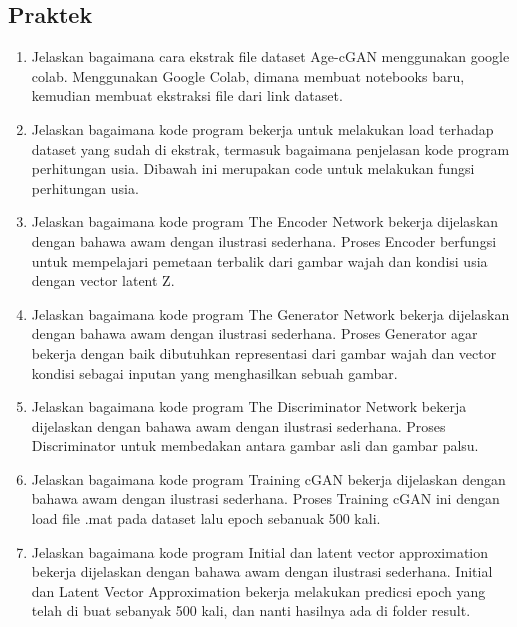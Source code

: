 \subsection{Praktek}
\begin{enumerate}
\item Jelaskan bagaimana cara ekstrak ﬁle dataset Age-cGAN menggunakan google colab.
Menggunakan Google Colab, dimana membuat notebooks baru, kemudian membuat ekstraksi file dari link dataset.




\item Jelaskan bagaimana kode program bekerja untuk melakukan load terhadap dataset yang sudah di ekstrak, termasuk bagaimana penjelasan kode program perhitungan usia.
Dibawah ini merupakan code untuk melakukan fungsi perhitungan usia.



	\item Jelaskan bagaimana kode program The Encoder Network bekerja dijelaskan dengan bahawa awam dengan ilustrasi sederhana.
Proses Encoder berfungsi untuk mempelajari pemetaan terbalik dari gambar wajah dan kondisi usia dengan vector latent Z.

		

	\item Jelaskan bagaimana kode program The Generator Network bekerja dijelaskan dengan bahawa awam dengan ilustrasi sederhana.
Proses Generator agar bekerja dengan baik dibutuhkan representasi dari gambar wajah dan vector kondisi sebagai inputan yang menghasilkan sebuah gambar.

		

        	\item Jelaskan bagaimana kode program The Discriminator Network bekerja dijelaskan dengan bahawa awam dengan ilustrasi sederhana.
Proses Discriminator untuk membedakan antara gambar asli dan gambar palsu.

		

        	\item Jelaskan bagaimana kode program Training cGAN bekerja dijelaskan dengan bahawa awam dengan ilustrasi sederhana.
Proses Training cGAN ini dengan load file .mat pada dataset lalu epoch sebanuak 500 kali.

		

        	\item Jelaskan bagaimana kode program Initial dan latent vector approximation bekerja dijelaskan dengan bahawa awam dengan ilustrasi sederhana.
Initial dan Latent Vector Approximation bekerja melakukan predicsi epoch yang telah di buat sebanyak 500 kali, dan nanti hasilnya ada di folder result.

		
\end{enumerate}

